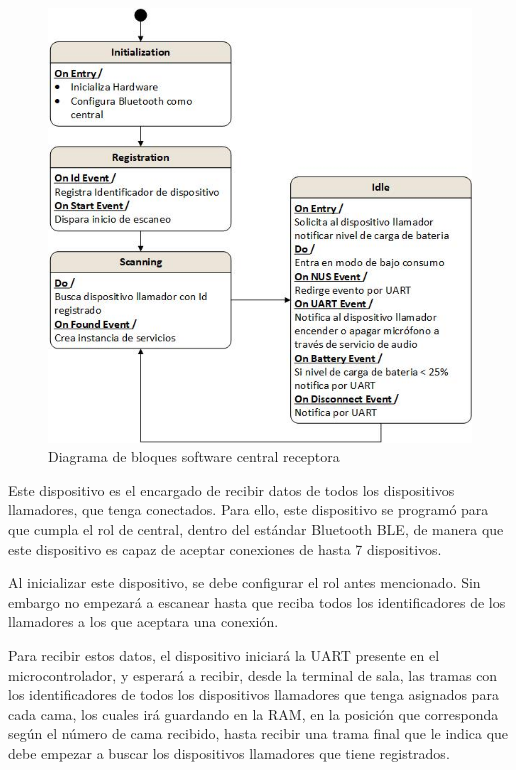 \begin{figure}[htpb]
	\centering
	\includegraphics[scale=0.8]{./Figures/Dcentral.jpeg}
	\caption{Diagrama de bloques software central receptora}
	\label{fig:DiagramaSoftCentral}
\end{figure}

Este dispositivo es el encargado de recibir datos de todos los dispositivos llamadores, que tenga conectados. Para ello, este dispositivo se programó para que cumpla el rol de central, dentro del estándar Bluetooth BLE, de manera que este dispositivo es capaz de aceptar conexiones de hasta 7 dispositivos.

Al inicializar este dispositivo, se debe configurar el rol antes mencionado. Sin embargo no empezará a escanear hasta que reciba todos los identificadores de los llamadores a los que aceptara una conexión.

Para recibir estos datos, el dispositivo iniciará la UART presente en el microcontrolador, y esperará a recibir, desde la terminal de sala, las tramas con los identificadores de todos los dispositivos llamadores que tenga asignados para cada cama, los cuales irá guardando en la RAM, en la posición que corresponda según el número de cama recibido, hasta recibir una trama final que le indica que debe empezar a buscar los dispositivos llamadores que tiene registrados. 

